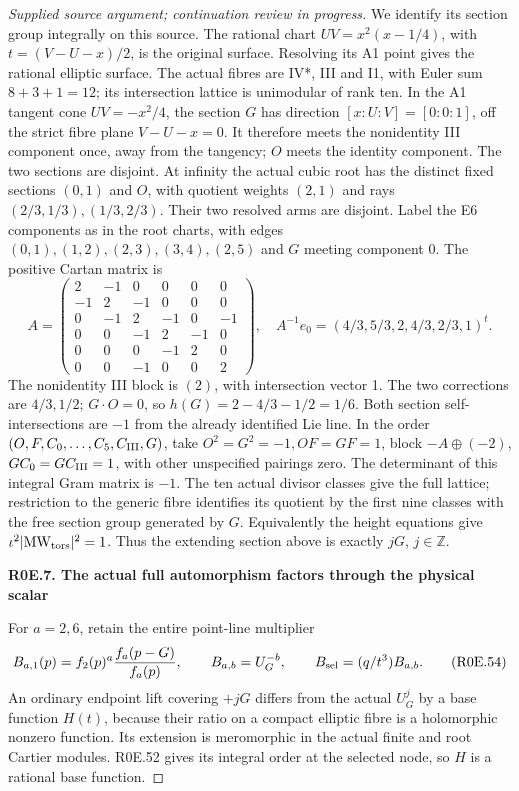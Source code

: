 \begin{proof}[Supplied source argument; continuation review in progress]
We identify its section group integrally on this source. The rational
chart \(UV=x^2(x-1/4)\), with
\(t=(V-U-x)/2\), is the original surface. Resolving its A1 point
gives the rational elliptic surface. The actual fibres are IV*, III
and I1, with Euler sum \(8+3+1=12\); its intersection lattice is
unimodular of rank ten. In the A1 tangent cone
\(UV=-x^2/4\), the section \(G\) has direction
\([x:U:V]=[0:0:1]\), off the strict fibre plane \(V-U-x=0\).
It therefore meets the nonidentity III component once, away from
the tangency; \(O\) meets the identity component. The two sections
are disjoint. At infinity the actual cubic root has the distinct
fixed sections \((0,1)\) and \(O\), with quotient weights \((2,1)\)
and rays \((2/3,1/3),(1/3,2/3)\). Their two resolved arms are
disjoint. Label the E6 components as in the root charts, with edges
\((0,1),(1,2),(2,3),(3,4),(2,5)\) and \(G\) meeting component 0.
The positive Cartan matrix is
\[
 A=\begin{pmatrix}
 2&-1&0&0&0&0\\-1&2&-1&0&0&0\\
 0&-1&2&-1&0&-1\\0&0&-1&2&-1&0\\
 0&0&0&-1&2&0\\0&0&-1&0&0&2
 \end{pmatrix},\quad
 A^{-1}e_0=(4/3,5/3,2,4/3,2/3,1)^t.
 \tag{R0E.53}
\]
The nonidentity III block is \((2)\), with intersection vector 1.
The two corrections are \(4/3,1/2\); \(G\cdot O=0\), so
\(h(G)=2-4/3-1/2=1/6\). Both section self-intersections are \(-1\)
from the already identified Lie line. In the order
\((O,F,C_0,\ldots,C_5,C_{\rm III},G)\), take
\(O^2=G^2=-1,OF=GF=1\), block \(-A\oplus(-2)\),
\(GC_0=GC_{\rm III}=1\), with other unspecified pairings zero.
The determinant of this integral Gram matrix is \(-1\). The ten
actual divisor classes give the full lattice; restriction to the
generic fibre identifies its quotient by the first nine classes
with the free section group generated by \(G\). Equivalently the
height equations give \(\iota^2|\mathrm{MW}_{\rm tors}|^2=1\).
Thus the extending section above is exactly \(jG\), \(j\in\mathbb Z\).

\par

\medskip\noindent\textbf{R0E.7. The actual full automorphism factors through the physical scalar}

\par\nobreak

For \(a=2,6\), retain the entire point-line multiplier
\[
 B_{a,1}(p)=f_2(p)^a\frac{f_a(p-G)}{f_a(p)},\qquad
 B_{a,b}=U_G^{-b},\qquad B_{\rm sel}=(q/t^3)B_{a,b}.
 \tag{R0E.54}
\]
An ordinary endpoint lift covering \(+jG\) differs from the actual
\(U_G^j\) by a base function \(H(t)\), because their ratio on a
compact elliptic fibre is a holomorphic nonzero function. Its
extension is meromorphic in the actual finite and root Cartier
modules. R0E.52 gives its integral order at the selected node, so
\(H\) is a rational base function.


\end{proof}
